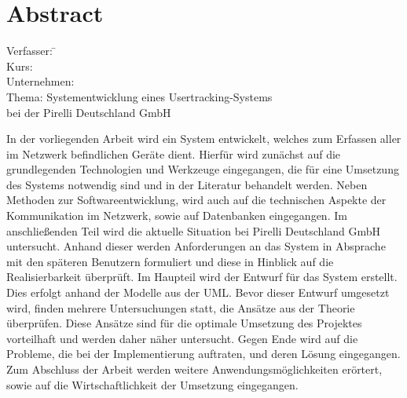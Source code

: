 \section*{Abstract}
\label{sec:Abstract}

\begin{tabbing}
Verfasser:	 \hspace{20mm} \= \autor\\
Kurs:	  \>\kursbez\\
Unternehmen:	  \>\firmenname\\
Thema:	  \> Systementwicklung eines Usertracking-Systems\\
		\> bei der Pirelli Deutschland GmbH\\
\end{tabbing}

In der vorliegenden Arbeit wird ein System entwickelt, welches zum Erfassen aller im Netzwerk befindlichen Geräte dient.
Hierfür wird zunächst auf die grundlegenden Technologien und Werkzeuge eingegangen, die für eine Umsetzung des Systems notwendig sind und in der Literatur behandelt werden.
Neben Methoden zur Softwareentwicklung, wird auch auf die technischen Aspekte der Kommunikation im Netzwerk, sowie auf Datenbanken eingegangen.
Im anschließenden Teil wird die aktuelle Situation bei Pirelli Deutschland GmbH untersucht. Anhand dieser werden Anforderungen an das System in Absprache mit den späteren Benutzern formuliert und diese in Hinblick auf die Realisierbarkeit überprüft.
Im Haupteil wird der Entwurf für das System erstellt. Dies erfolgt anhand der Modelle aus der UML.
Bevor dieser Entwurf umgesetzt wird, finden mehrere Untersuchungen statt, die Ansätze aus der Theorie überprüfen. Diese Ansätze sind für die optimale Umsetzung des Projektes vorteilhaft und werden daher näher untersucht.
Gegen Ende wird auf die Probleme, die bei der Implementierung auftraten, und deren Lösung eingegangen. 
Zum Abschluss der Arbeit werden weitere Anwendungsmöglichkeiten erörtert, sowie auf die Wirtschaftlichkeit der Umsetzung eingegangen.